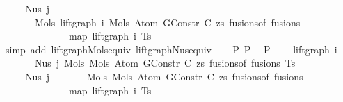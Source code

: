 \begin{isabellebody}
\ \ \ \ \ Nus{}\ j\isanewline
\ \ \ \ \ \ \ {\isacharparenleft}{\kern0pt}Mols{}\ {\isacharparenleft}{\kern0pt}lift{\isacharunderscore}{\kern0pt}graph\ i\ {\isacharparenleft}{\kern0pt}Mols{}\ {\isacharparenleft}{\kern0pt}Atom\ {\isacharparenleft}{\kern0pt}GConstr\ C{\isacharparenright}{\kern0pt}\ zs{\isacharparenright}{\kern0pt}\ {\isacharparenleft}{\kern0pt}fusions{\isacharunderscore}{\kern0pt}of\ fusions{\isacharparenright}{\kern0pt}{\isacharparenright}{\kern0pt}{\isacharparenright}{\kern0pt}\isanewline
\ \ \ \ \ \ \ \ \ \ \ \ \ \ {\isacharparenleft}{\kern0pt}map\ {\isacharparenleft}{\kern0pt}lift{\isacharunderscore}{\kern0pt}graph\ i{\isacharparenright}{\kern0pt}\ Ts{\isacharparenright}{\kern0pt}{\isacharparenright}{\kern0pt}{\isachardoublequoteclose}\isanewline
\ \ \ \ \isamarkupfalse%
\ {\isacharparenleft}{\kern0pt}simp\ add{\isacharcolon}{\kern0pt}\ lift{\isacharunderscore}{\kern0pt}graph{\isacharunderscore}{\kern0pt}Mols{}{\isacharunderscore}{\kern0pt}equiv\ lift{\isacharunderscore}{\kern0pt}graph{\isacharunderscore}{\kern0pt}Nus{}{\isacharunderscore}{\kern0pt}equiv{\isacharparenright}{\kern0pt}\isanewline
\isanewline
\ \ \isamarkupfalse%
\ P{}\ P{}\ \isamarkupfalse%
\ P{}{\isacharcolon}{\kern0pt}\isanewline
\ \ \ \ {\isachardoublequoteopen}lift{\isacharunderscore}{\kern0pt}graph\ i\isanewline
\ \ \ \ \ \ \ {\isacharparenleft}{\kern0pt}Nus{}\ j\ {\isacharparenleft}{\kern0pt}Mols{}\ {\isacharparenleft}{\kern0pt}Mols{}\ {\isacharparenleft}{\kern0pt}Atom\ {\isacharparenleft}{\kern0pt}GConstr\ C{\isacharparenright}{\kern0pt}\ zs{\isacharparenright}{\kern0pt}\ {\isacharparenleft}{\kern0pt}fusions{\isacharunderscore}{\kern0pt}of\ fusions{\isacharparenright}{\kern0pt}{\isacharparenright}{\kern0pt}\ Ts{\isacharparenright}{\kern0pt}{\isacharparenright}{\kern0pt}\ {\isacharequal}{\kern0pt}\isanewline
\ \ \ \ \ Nus{}\ j\isanewline
\ \ \ \ \ \ \ {\isacharparenleft}{\kern0pt}Mols{}\ {\isacharparenleft}{\kern0pt}Mols{}\ {\isacharparenleft}{\kern0pt}Atom\ {\isacharparenleft}{\kern0pt}GConstr\ C{\isacharparenright}{\kern0pt}\ zs{\isacharparenright}{\kern0pt}\ {\isacharparenleft}{\kern0pt}fusions{\isacharunderscore}{\kern0pt}of\ fusions{\isacharparenright}{\kern0pt}{\isacharparenright}{\kern0pt}\isanewline
\ \ \ \ \ \ \ \ \ \ \ \ \ \ {\isacharparenleft}{\kern0pt}map\ {\isacharparenleft}{\kern0pt}lift{\isacharunderscore}{\kern0pt}graph\ i{\isacharparenright}{\kern0pt}\ Ts{\isacharparenright}{\kern0pt}{\isacharparenright}{\kern0pt}{\isachardoublequoteclose}\isanewline

\end{isabellebody}
